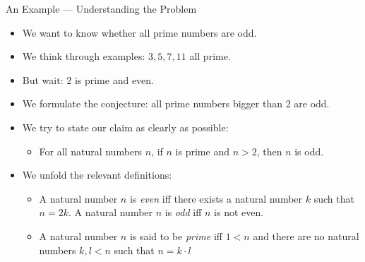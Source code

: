 \begin{frame}{An Example --- Understanding the Problem}


	\begin{itemize}
	
		\item We want to know whether all prime numbers are odd.
		
		\item We think through examples: $3,5,7,11$ all prime.
		
		\item But wait: $2$ is prime and even.
		
		\item We formulate the conjecture: all prime numbers bigger than 2 are odd.
		
		\item We try to state our claim as clearly as possible:
		
		\begin{itemize}
		
			\item For all natural numbers $n$, if $n$ is prime and $n>2$, then $n$ is odd.
		
		\end{itemize}
		
		\item We unfold the relevant definitions:
		
			\begin{itemize}
			
				\item A natural number $n$ is \emph{even} iff there exists a natural number $k$ such that $n=2k$. A natural number $n$ is \emph{odd} iff $n$ is not even.
				
				\item A natural number $n$ is said to be \emph{prime} iff $1<n$ and  there are no natural numbers $k,l<n$ such that $n=k\cdot l$

			
			\end{itemize}
	
	\end{itemize}
	

\end{frame}

